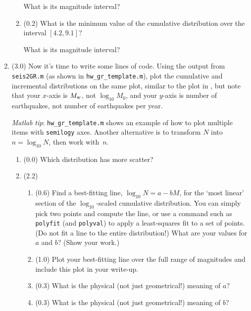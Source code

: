 \documentclass[11pt,titlepage,fleqn]{article}
\begin{document}
\begin{enumerate}
\begin{enumerate}
What is its magnitude interval?

\item (0.2) What is the minimum value of the cumulative distribution over the interval $[4.2,9.1]$? 

What is its magnitude interval?

\end{enumerate}


\item (3.0) Now it's time to write some lines of code. Using the output from \verb+seis2GR.m+ (as shown in \verb+hw_gr_template.m+), plot the cumulative and incremental distributions on the same plot, similar to the plot in \citet[][Figure~4.7-2]{SteinWysession}, but note that your $x$-axis is $M_{\rm w}$, not $\log_{10} M_0$, and your $y$-axis is number of earthquakes, not number of earthquakes per year.

{\em Matlab tip}: \verb+hw_gr_template.m+ shows an example of how to plot multiple items with \verb+semilogy+ axes. Another alternative is to transform $N$ into $n = \log_{10} N$, then work with~$n$.

\begin{enumerate}
\item (0.0) Which distribution has more scatter?

\item (2.2)

\begin{enumerate}
\item (0.6) Find a best-fitting line, $\log_{10} N = a - b M$, for the `most linear' section of the $\log_{10}$-scaled cumulative distribution. You can simply pick two points and compute the line, or use a command such as \verb+polyfit+ (and \verb+polyval+) to apply a least-squares fit to a set of points. (Do not fit a line to the entire distribution!) What are your values for $a$ and $b$? (Show your work.)

\item (1.0) Plot your best-fitting line over the full range of magnitudes and include this plot in your write-up. 

\item (0.3) What is the physical (not just geometrical!) meaning of $a$?

\item (0.3) What is the physical (not just geometrical!) meaning of $b$?

\end{enumerate}


\end{enumerate}
\end{enumerate}
\end{document}
